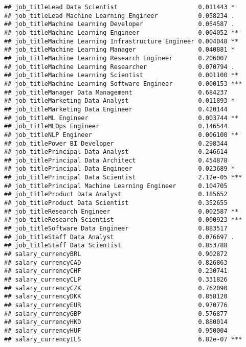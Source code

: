 \documentclass[
]{article}
\begin{document}
\begin{verbatim}
## job_titleLead Data Scientist                      0.011443 *  
## job_titleLead Machine Learning Engineer           0.058234 .  
## job_titleMachine Learning Developer               0.054587 .  
## job_titleMachine Learning Engineer                0.004052 ** 
## job_titleMachine Learning Infrastructure Engineer 0.004048 ** 
## job_titleMachine Learning Manager                 0.040881 *  
## job_titleMachine Learning Research Engineer       0.206007    
## job_titleMachine Learning Researcher              0.070794 .  
## job_titleMachine Learning Scientist               0.001100 ** 
## job_titleMachine Learning Software Engineer       0.000153 ***
## job_titleManager Data Management                  0.684237    
## job_titleMarketing Data Analyst                   0.011893 *  
## job_titleMarketing Data Engineer                  0.420144    
## job_titleML Engineer                              0.003744 ** 
## job_titleMLOps Engineer                           0.146544    
## job_titleNLP Engineer                             0.006100 ** 
## job_titlePower BI Developer                       0.298344    
## job_titlePrincipal Data Analyst                   0.246614    
## job_titlePrincipal Data Architect                 0.454878    
## job_titlePrincipal Data Engineer                  0.023689 *  
## job_titlePrincipal Data Scientist                 2.12e-05 ***
## job_titlePrincipal Machine Learning Engineer      0.104705    
## job_titleProduct Data Analyst                     0.185652    
## job_titleProduct Data Scientist                   0.352655    
## job_titleResearch Engineer                        0.002587 ** 
## job_titleResearch Scientist                       0.000923 ***
## job_titleSoftware Data Engineer                   0.883517    
## job_titleStaff Data Analyst                       0.076697 .  
## job_titleStaff Data Scientist                     0.853788    
## salary_currencyBRL                                0.902872    
## salary_currencyCAD                                0.826863    
## salary_currencyCHF                                0.230741    
## salary_currencyCLP                                0.331826    
## salary_currencyCZK                                0.762090    
## salary_currencyDKK                                0.858120    
## salary_currencyEUR                                0.970776    
## salary_currencyGBP                                0.576877    
## salary_currencyHKD                                0.880014    
## salary_currencyHUF                                0.950004    
## salary_currencyILS                                6.82e-07 ***

\end{verbatim}
\end{document}
